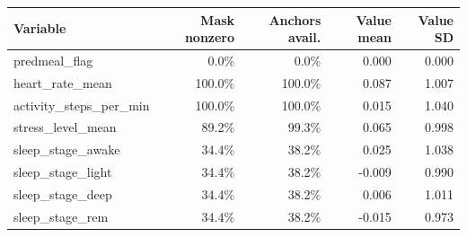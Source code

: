 \begin{tabular}{lrrrr}
\toprule
Variable & Mask nonzero & Anchors avail. & Value mean & Value SD \\
\midrule
predmeal\_flag & 0.0\% & 0.0\% & 0.000 & 0.000 \\
heart\_rate\_mean & 100.0\% & 100.0\% & 0.087 & 1.007 \\
activity\_steps\_per\_min & 100.0\% & 100.0\% & 0.015 & 1.040 \\
stress\_level\_mean & 89.2\% & 99.3\% & 0.065 & 0.998 \\
sleep\_stage\_awake & 34.4\% & 38.2\% & 0.025 & 1.038 \\
sleep\_stage\_light & 34.4\% & 38.2\% & -0.009 & 0.990 \\
sleep\_stage\_deep & 34.4\% & 38.2\% & 0.006 & 1.011 \\
sleep\_stage\_rem & 34.4\% & 38.2\% & -0.015 & 0.973 \\
\bottomrule
\end{tabular}

